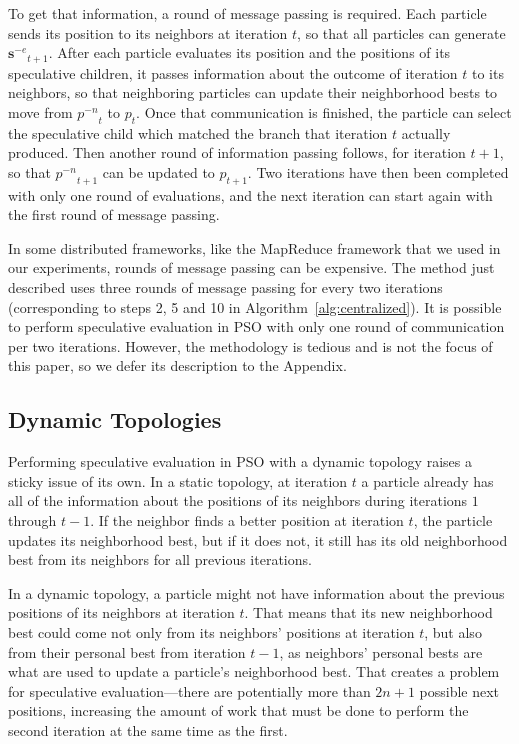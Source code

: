 \documentclass[journal,letterpaper]{IEEEtran}
\newcommand{\alg}[1]{Algorithm~\ref{alg:#1}}
\providecommand{\noeval}[1]{\ensuremath{#1^{-e}}}
\providecommand{\nonbest}[1]{\ensuremath{#1^{-n}}}
\providecommand{\p}{\ensuremath{p}}
\providecommand{\sset}{\ensuremath{\mathbf{s}}}
\begin{document}
To get that information, a round of message passing is required.  Each particle
sends its position to its neighbors at iteration $t$, so that all particles can
generate $\noeval{\sset}_{t+1}$.  After each particle evaluates its position
and the positions of its speculative children, it passes information about the
outcome of iteration $t$ to its neighbors, so that neighboring particles can
update their neighborhood bests to move from $\nonbest{\p}_t$ to $\p_t$.  Once
that communication is finished, the particle can select the speculative child
which matched the branch that iteration $t$ actually produced.  Then another
round of information passing follows, for iteration $t+1$, so that
$\nonbest{\p}_{t+1}$ can be updated to $\p_{t+1}$.  Two iterations have then
been completed with only one round of evaluations, and the next iteration can
start again with the first round of message passing.

In some distributed frameworks, like the MapReduce framework that we used in
our experiments, rounds of message passing can be expensive.  The method just
described uses three rounds of message passing for every two iterations
(corresponding to steps 2, 5 and 10 in \alg{centralized}).  It is possible to
perform speculative evaluation in PSO with only one round of communication per
two iterations.  However, the methodology is tedious and is not the focus of
this paper, so we defer its description to the Appendix.

\subsection{Dynamic Topologies}

Performing speculative evaluation in PSO with a dynamic topology raises a
sticky issue of its own.  In a static topology, at iteration $t$ a particle
already has all of the information about the positions of its neighbors during
iterations $1$ through $t-1$.  If the neighbor finds a better position at
iteration $t$, the particle updates its neighborhood best, but if it does not,
it still has its old neighborhood best from its neighbors for all previous
iterations.

In a dynamic topology, a particle might not have information about the previous
positions of its neighbors at iteration $t$.  That means that its new
neighborhood best could come not only from its neighbors' positions at
iteration $t$, but also from their personal best from iteration $t-1$, as
neighbors' personal bests are what are used to update a particle's neighborhood
best.  That creates a problem for speculative evaluation---there are
potentially more than $2n+1$ possible next positions, increasing the amount of
work that must be done to perform the second iteration at the same time as the
first.
\end{document}
